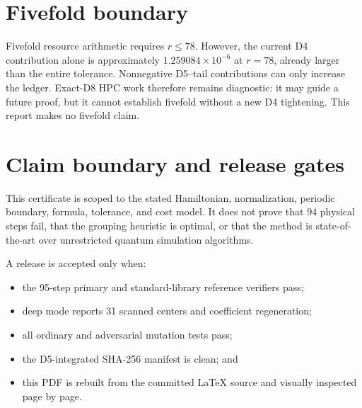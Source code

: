 \documentclass[10pt]{article}
\begin{document}
\section{Fivefold boundary}

Fivefold resource arithmetic requires $r\le78$.  However, the current D4
contribution alone is approximately $1.259084\times10^{-6}$ at $r=78$, already
larger than the entire tolerance.  Nonnegative D5--tail contributions can only
increase the ledger.  Exact-D8 HPC work therefore remains diagnostic: it may
guide a future proof, but it cannot establish fivefold without a new D4
tightening.  This report makes no fivefold claim.

\section{Claim boundary and release gates}

This certificate is scoped to the stated Hamiltonian, normalization, periodic
boundary, formula, tolerance, and cost model.  It does not prove that 94
physical steps fail, that the grouping heuristic is optimal, or that the
method is state-of-the-art over unrestricted quantum simulation algorithms.

A release is accepted only when:
\begin{itemize}
  \item the 95-step primary and standard-library reference verifiers pass;
  \item deep mode reports 31 scanned centers and coefficient regeneration;
  \item all ordinary and adversarial mutation tests pass;
  \item the D5-integrated SHA-256 manifest is clean; and
  \item this PDF is rebuilt from the committed \LaTeX{} source and visually
        inspected page by page.
\end{itemize}
\end{document}
